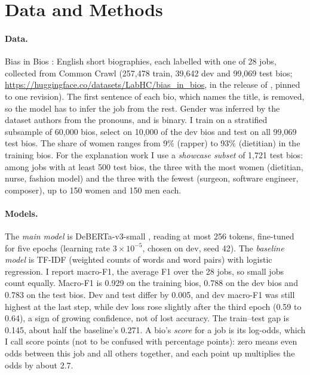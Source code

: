 \documentclass[11pt]{article}
\begin{document}
\section{Data and Methods}

\paragraph{Data.} Bias in Bios \citep{dearteaga2019bias}: English short biographies, each labelled with one of 28 jobs, collected from Common Crawl (257,478 train, 39,642 dev and 99,069 test bios; \url{https://huggingface.co/datasets/LabHC/bias_in_bios}, in the release of \citet{ravfogel2020inlp}, pinned to one revision). The first sentence of each bio, which names the title, is removed, so the model has to infer the job from the rest. Gender was inferred by the dataset authors from the pronouns, and is binary. I train on a stratified subsample of 60,000 bios, select on 10,000 of the dev bios and test on all 99,069 test bios. The share of women ranges from 9\% (rapper) to 93\% (dietitian) in the training bios. For the explanation work I use a \emph{showcase subset} of 1,721 test bios: among jobs with at least 500 test bios, the three with the most women (dietitian, nurse, fashion model) and the three with the fewest (surgeon, software engineer, composer), up to 150 women and 150 men each.

\paragraph{Models.} The \emph{main model} is DeBERTa-v3-small \citep{he2023debertav3}, reading at most 256 tokens, fine-tuned for five epochs (learning rate $3\times10^{-5}$, chosen on dev, seed 42). The \emph{baseline model} is TF-IDF (weighted counts of words and word pairs) with logistic regression. I report macro-F1, the average F1 over the 28 jobs, so small jobs count equally. Macro-F1 is 0.929 on the training bios, 0.788 on the dev bios and 0.783 on the test bios. Dev and test differ by 0.005, and dev macro-F1 was still highest at the last step, while dev loss rose slightly after the third epoch (0.59 to 0.64), a sign of growing confidence, not of lost accuracy. The train--test gap is 0.145, about half the baseline's 0.271. A bio's \emph{score} for a job is its log-odds, which I call score points (not to be confused with percentage points): zero means even odds between this job and all others together, and each point up multiplies the odds by about 2.7.
\end{document}
